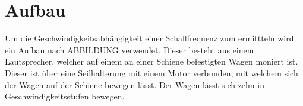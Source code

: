 \section{Aufbau}
\label{sec:Aufbau}
Um die Geschwindigkeitsabhängigkeit einer Schallfrequenz zum ermittteln wird ein Aufbau nach ABBILDUNG
 verwendet. Dieser besteht aus einem Lautsprecher, welcher auf einem an einer Schiene befestigten Wagen moniert ist.
 Dieser ist über eine Seilhalterung mit einem Motor verbunden, mit welchem sich der Wagen auf der Schiene bewegen lässt. Der Wagen lässt sich zehn in Geschwindigkeitsstufen bewegen. 
